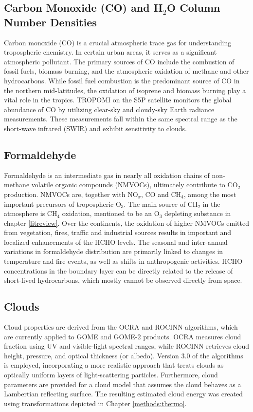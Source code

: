 \subsection{Carbon Monoxide (CO) and H$_2$O Column Number Densities} \label{tmas:co} Carbon monoxide (CO) is a crucial atmospheric trace gas for understanding tropospheric chemistry. In certain urban areas, it serves as a significant atmospheric pollutant. The primary sources of CO include the combustion of fossil fuels, biomass burning, and the atmospheric oxidation of methane and other hydrocarbons. While fossil fuel combustion is the predominant source of CO in the northern mid-latitudes, the oxidation of isoprene and biomass burning play a vital role in the tropics. TROPOMI on the S5P satellite monitors the global abundance of CO by utilizing clear-sky and cloudy-sky Earth radiance measurements. These measurements fall within the same spectral range as the short-wave infrared (SWIR) and exhibit sensitivity to clouds.
\subsection{Formaldehyde} \label{tmas:ch2o} Formaldehyde is an intermediate gas in nearly all oxidation chains of non-methane volatile organic compounds (NMVOCs), ultimately contribute to CO$_2$ production. NMVOCs are, together with NO$_x$, CO and CH$_4$, among the most important precursors of tropospheric O$_3$. The main source of CH$_2$ in the atmosphere is CH$_4$ oxidation, mentioned to be an O$_3$ depleting substance in chapter \ref{litreview}. Over the continents, the oxidation of higher NMVOCs emitted from vegetation, fires, traffic and industrial sources results in important and localized enhancements of the HCHO levels. The seasonal and inter-annual variations in formaldehyde distribution are primarily linked to changes in temperature and fire events, as well as shifts in anthropogenic activities. HCHO concentrations in the boundary layer can be directly related to the release of short-lived hydrocarbons, which mostly cannot be observed directly from space.
\subsection{Clouds} \label{tmas:clouds} Cloud properties are derived from the OCRA and ROCINN algorithms, which are currently applied to GOME and GOME-2 products. OCRA measures cloud fraction using UV and visible-light spectral ranges, while ROCINN retrieves cloud height, pressure, and optical thickness (or albedo). Version 3.0 of the algorithms is employed, incorporating a more realistic approach that treats clouds as optically uniform layers of light-scattering particles. Furthermore, cloud parameters are provided for a cloud model that assumes the cloud behaves as a Lambertian reflecting surface. The resulting estimated cloud energy was created using transformations depicted in Chapter \ref{methods:thermo}.
